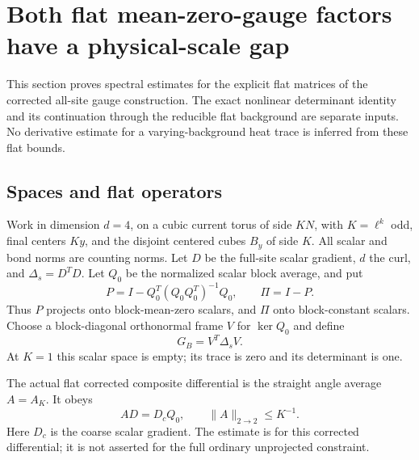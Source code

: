 \section{Both flat mean-zero-gauge factors have a physical-scale gap}
\label{mgs-section}

This section proves spectral estimates for the explicit flat matrices
of the corrected all-site gauge construction.
The exact nonlinear determinant identity and its continuation through
the reducible flat background are separate inputs.
No derivative estimate for a varying-background heat trace is inferred
from these flat bounds.

\subsection{Spaces and flat operators}
\label{mgs-spaces-section}

Work in dimension \(d=4\), on a cubic current torus of side \(KN\),
with \(K=\ell^k\) odd, final centers \(Ky\), and the disjoint centered
cubes \(B_y\) of side \(K\).
All scalar and bond norms are counting norms.
Let \(D\) be the full-site scalar gradient, \(d\) the curl, and
\(\Delta_s=D^TD\).
Let \(Q_0\) be the normalized scalar block average, and put
\begin{equation}
 P=I-Q_0^T(Q_0Q_0^T)^{-1}Q_0,\qquad \Pi=I-P .
 \label{mgs-projections}
\end{equation}
Thus \(P\) projects onto block-mean-zero scalars, and \(\Pi\)
onto block-constant scalars.
Choose a block-diagonal orthonormal frame \(V\) for \(\ker Q_0\)
and define
\begin{equation}
                       G_B=V^T\Delta_sV.
 \label{mgs-ghost}
\end{equation}
At \(K=1\) this scalar space is empty; its trace is zero and
its determinant is one.

The actual flat corrected composite differential is the straight
angle average \(A=A_K\). It obeys
\begin{equation}
 AD=D_cQ_0,\qquad \|A\|_{2\to2}\le K^{-1}.
 \label{mgs-average}
\end{equation}
Here \(D_c\) is the coarse scalar gradient.
The estimate is for this corrected differential; it is not
asserted for the full ordinary unprojected constraint.

